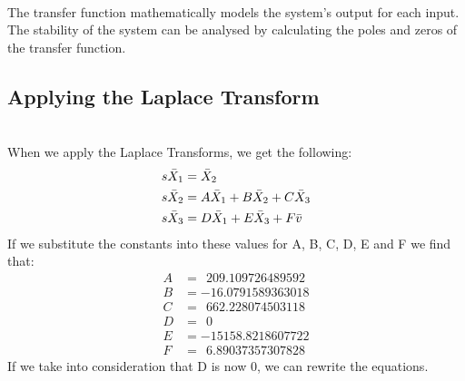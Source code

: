 ~\\
The transfer function mathematically models the system’s output for each input. The stability of the system
can be analysed by calculating the poles and zeros of the transfer function.
\subsection*{Applying the Laplace Transform} \hfill \\
When we apply the Laplace Transforms, we get the following:
\begin{align}
    s\Bar{X}_1 &= \Bar{X}_2
    \\
    s\Bar{{X}}_2 &= A\Bar{X}_1 + 
    B\Bar{X}_2 + C\Bar{X}_3
    \\
    s\Bar{X}_3 &= D\Bar{X}_1 + 
    E\Bar{X}_3 + F\Bar{v}
\end{align}
If we substitute the constants into these values for A, B, C, D, E and F we find that:
\begin{align*}
    A &= \ \ 209.109726489592
    \\
    B &= -16.0791589363018
    \\
    C &= \ \ 662.228074503118
    \\
    D &=\ \ 0
    \\
    E &= -15158.8218607722
    \\
    F &= \ \ 6.89037357307828
\end{align*}
If we take into consideration that D is now 0, we can rewrite the equations.
